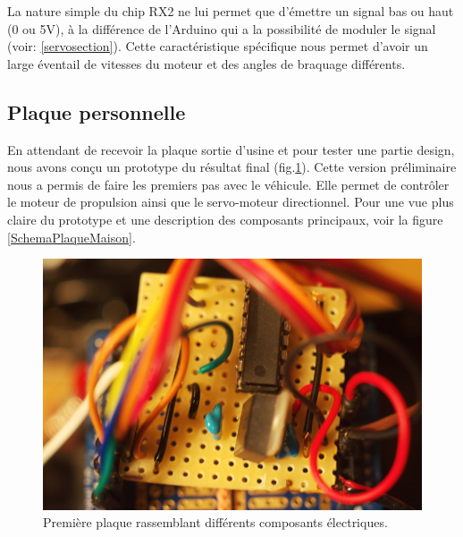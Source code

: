 \documentclass[a4paper,11pt]{report}
\begin{document}
{La nature simple du chip RX2 ne lui permet que d'émettre un signal bas ou haut
(0 ou 5V), à la différence de l'Arduino qui a la possibilité de moduler le
signal (voir: \ref{servosection}). Cette caractéristique spécifique nous permet
d'avoir un large éventail de vitesses du moteur et des angles de braquage
différents. 



\subsection{Plaque personnelle}
En attendant de recevoir la plaque sortie d'usine et pour tester une partie
design, nous avons conçu un prototype du résultat final
(fig.\ref{PPFigure}). Cette version préliminaire nous a permis de faire les
premiers
pas avec le véhicule. Elle permet de contrôler le moteur de propulsion ainsi
que le servo-moteur directionnel.
Pour une vue plus claire du prototype et une description des composants
principaux, voir la figure \ref{SchemaPlaqueMaison}. 

\begin{figure}[h]
\centering
\includegraphics[width=1.0\textwidth]{figures/DSC_1116res}
    \caption[Prototype du PCB]{\label{PPFigure}Première plaque rassemblant différents composants électriques. 
    }
\end{figure}
 
}
\end{document}

